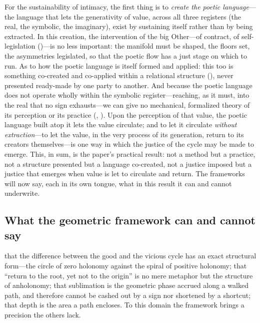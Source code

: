 For the sustainability of intimacy, the first thing is to \emph{create the poetic language}---the language that lets the generativity of value, across all three registers (the real, the symbolic, the imaginary), exist by sustaining itself rather than by being extracted. In this creation, the intervention of the big Other---of contract, of self-legislation ()---is no less important: the manifold must be shaped, the floors set, the asymmetries legislated, so that the poetic flow has a just stage on which to run. As to how the poetic language is itself formed and applied: this too is something co-created and co-applied within a relational structure (), never presented ready-made by one party to another. And because the poetic language does not operate wholly within the symbolic register---reaching, as it must, into the real that no sign exhausts---we can give no mechanical, formalized theory of its perception or its practice (, ).  Upon the perception of that value, the poetic language built atop it lets the value circulate; and to let it circulate \emph{without extraction}---to let the value, in the very process of its generation, return to its creators themselves---is one way in which the justice of the cycle may be made to emerge. This, in sum, is the paper's practical result: not a method but a practice, not a structure presented but a language co-created, not a justice imposed but a justice that emerges when value is let to circulate and return. The frameworks will now say, each in its own tongue, what in this result it can and cannot underwrite.

\subsection{What the geometric framework can and cannot say}
\label{p09:sec:concl-geom}

 that the difference between the good and the vicious cycle has an exact structural form---the circle of zero holonomy against the spiral of positive holonomy; that ``return to the root, yet not to the origin'' is no mere metaphor but the structure of anholonomy; that sublimation is the geometric phase accrued along a walked path, and therefore cannot be cashed out by a sign nor shortened by a shortcut; that depth is the area a path encloses. To this domain the framework brings a precision the others lack.

